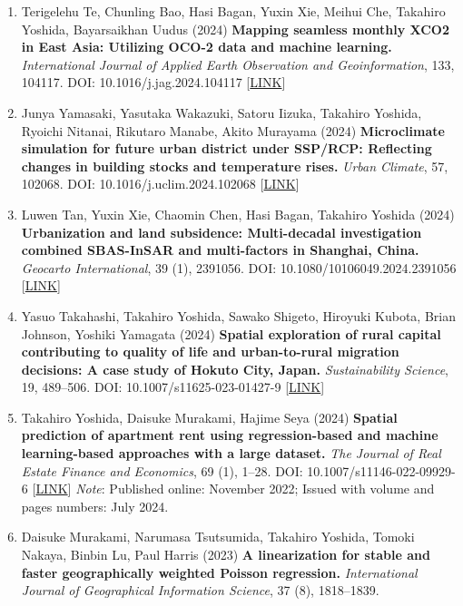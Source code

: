 \documentclass[
]{book}
\begin{document}
\begin{enumerate}
\item
  Terigelehu Te, Chunling Bao, Hasi Bagan, Yuxin Xie, Meihui Che, Takahiro Yoshida, Bayarsaikhan Uudus (2024)
  \textbf{Mapping seamless monthly XCO2 in East Asia: Utilizing OCO-2 data and machine learning.}
  \emph{International Journal of Applied Earth Observation and Geoinformation}, 133, 104117.
  DOI: 10.1016/j.jag.2024.104117 {[}\href{https://www.sciencedirect.com/science/article/pii/S1569843224004710}{LINK}{]}
\item
  Junya Yamasaki, Yasutaka Wakazuki, Satoru Iizuka, Takahiro Yoshida, Ryoichi Nitanai, Rikutaro Manabe, Akito Murayama (2024)
  \textbf{Microclimate simulation for future urban district under SSP/RCP: Reflecting changes in building stocks and temperature rises.}
  \emph{Urban Climate}, 57, 102068.
  DOI: 10.1016/j.uclim.2024.102068 {[}\href{https://www.sciencedirect.com/science/article/pii/S2212095524002645}{LINK}{]}
\item
  Luwen Tan, Yuxin Xie, Chaomin Chen, Hasi Bagan, Takahiro Yoshida (2024)
  \textbf{Urbanization and land subsidence: Multi-decadal investigation combined SBAS-InSAR and multi-factors in Shanghai, China.}
  \emph{Geocarto International}, 39 (1), 2391056.
  DOI: 10.1080/10106049.2024.2391056 {[}\href{https://www.tandfonline.com/doi/full/10.1080/10106049.2024.2391056}{LINK}{]}
\item
  Yasuo Takahashi, Takahiro Yoshida, Sawako Shigeto, Hiroyuki Kubota, Brian Johnson, Yoshiki Yamagata (2024)
  \textbf{Spatial exploration of rural capital contributing to quality of life and urban-to-rural migration decisions: A case study of Hokuto City, Japan.}
  \emph{Sustainability Science}, 19, 489--506.
  DOI: 10.1007/s11625-023-01427-9 {[}\href{https://link.springer.com/article/10.1007/s11625-023-01427-9}{LINK}{]}
\item
  Takahiro Yoshida, Daisuke Murakami, Hajime Seya (2024)
  \textbf{Spatial prediction of apartment rent using regression-based and machine learning-based approaches with a large dataset.}
  \emph{The Journal of Real Estate Finance and Economics}, 69 (1), 1--28.
  DOI: 10.1007/s11146-022-09929-6 {[}\href{https://link.springer.com/article/10.1007/s11146-022-09929-6}{LINK}{]}
  \emph{Note}: Published online: November 2022; Issued with volume and pages numbers: July 2024.
\item
  Daisuke Murakami, Narumasa Tsutsumida, Takahiro Yoshida, Tomoki Nakaya, Binbin Lu, Paul Harris (2023)
  \textbf{A linearization for stable and faster geographically weighted Poisson regression.}
  \emph{International Journal of Geographical Information Science}, 37 (8), 1818--1839.

\end{enumerate}
\end{document}
